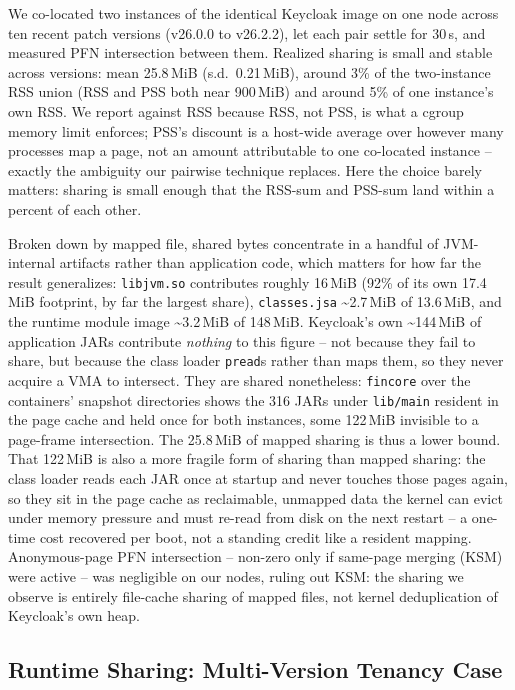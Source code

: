 \documentclass[sigplan,10pt,natbib=false]{acmart}
\begin{document}
We co-located two instances of the identical Keycloak image on one
node across ten recent patch versions (v26.0.0 to v26.2.2), let each
pair settle for 30\,s, and measured PFN intersection between them.
Realized sharing is small and stable across versions: mean 25.8\,MiB
(s.d.\ 0.21\,MiB), around 3\% of the two-instance RSS union (RSS and
PSS both near 900\,MiB) and around 5\% of one instance's own RSS. We
report against RSS because RSS, not PSS, is what a cgroup memory limit
enforces; PSS's discount is a host-wide
average over however many processes map a page, not an amount
attributable to one co-located instance -- exactly the ambiguity our
pairwise technique replaces. Here the choice barely matters: sharing is
small enough that the RSS-sum and PSS-sum land within a percent of each
other.

Broken down by mapped file, shared bytes concentrate in a handful of
JVM-internal artifacts rather than application code, which matters for
how far the result generalizes: \texttt{libjvm.so} contributes roughly
16\,MiB (92\% of its own 17.4\,MiB footprint, by far the largest
share), \texttt{classes.jsa} \textasciitilde2.7\,MiB of 13.6\,MiB, and
the runtime module image \textasciitilde3.2\,MiB of 148\,MiB.
Keycloak's own \textasciitilde144\,MiB of application JARs contribute
\emph{nothing} to this figure -- not because they fail to share, but
because the class loader \texttt{pread}s rather than maps them, so
they never acquire a VMA to intersect. They are shared nonetheless:
\texttt{fincore} over the containers' snapshot directories shows the
316 JARs under \texttt{lib/main} resident in the page cache and held
once for both instances, some 122\,MiB invisible to a page-frame
intersection. The 25.8\,MiB of mapped sharing is thus a lower bound.
That 122\,MiB is also a more fragile form of sharing than mapped
sharing: the class loader reads each JAR once at startup and never
touches those pages again, so they sit in the page cache as
reclaimable, unmapped data the kernel can evict under memory pressure
and must re-read from disk on the next restart -- a one-time cost
recovered per boot, not a standing credit like a resident mapping.
Anonymous-page PFN intersection -- non-zero only if same-page merging
(KSM) were active -- was negligible on our nodes, ruling out KSM: the
sharing we observe is entirely file-cache sharing of mapped files, not
kernel deduplication of Keycloak's own heap.

\subsection{Runtime Sharing: Multi-Version Tenancy Case}
\label{sec:cross-version}
\end{document}
